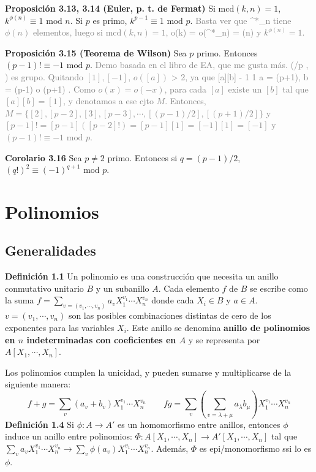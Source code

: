 \documentclass[a4paper, 11pt]{extarticle}
\newcommand{\propo}[1]{\textcolor{rojo}{\textbf{Proposición #1}}}
\newcommand{\defi}[1]{\textcolor{azul}{\textbf{Definición #1}}}
\newcommand{\cor}[1]{\textcolor{rosa}{\textbf{Corolario #1}}}
\begin{document}
{\propo{3.13, 3.14 (Euler, p. t. de Fermat)} Si \(\text{mcd}(k,n) = 1\), \(k^{\phi(n)} \equiv 1 \text{ mod } n\). Si \(p\) es primo, \(k^{p-1} \equiv 1
\text{ mod } p\).
\textcolor{gray}{\footnotesize Basta ver que ^*_n tiene \( \phi(n) \) 
elementos, luego si \( \text{mcd}(k,n) = 1 \), o(k) = o(^*_n) = \phi(n) y \( k^{\phi(n)} = 1 \).}

\propo{3.15 (Teorema de Wilson)} Sea \(p\) primo. Entonces \((p-1)! \equiv -1
\text{ mod } p\). 
\textcolor{gray}{\footnotesize Demo basada en el libro de EA, que me gusta más.
(/p , \cdot)\) es grupo. Quitando \( [1], [-1] \), \( o([a]) \) > 2,
ya que [a][b] \equiv - 1  1 \iff a = (p+1), b = (p-1) o (p+1) \). Como \( o(x) = o(-x) \),
para cada \( [a] \) existe un \( [b] \) tal que \( [a][b] = [1] \), y denotamos a ese cjto \( M \).
Entonces, \( M = \{ [2], [p-2], [3], [p-3], \cdots, [(p-1)/2], [(p+1)/2] \} \) y
\( [p-1]! = [p-1]([p-2]!) = [p-1][1] = [-1][1] = [-1] \) y \( (p-1)! \equiv -1 \text{ mod } p \).  }

\cor{3.16} Sea \(p \neq 2\) primo. Entonces si \(q = (p-1)/2\), \((q!)^2
\equiv (-1)^{q+1} \text{ mod } p\).

\section*{Polinomios}
\label{sec:orgb2b4b92}
\subsection*{Generalidades}
\label{sec:org7f20d91}
\defi{1.1} Un polinomio es una construcción que necesita un anillo conmutativo
unitario \(B\) y un subanillo \(A\). Cada elemento \(f\) de \(B\) se
escribe como la suma \(f = \sum _{v = (v_1, \cdots, v_n)}^{}a_vX_1^{v_1}\cdots 
X_n^{v_n}\) donde cada \(X_i \in B\) y \(a \in A\). \(v = (v_1, \cdots,
v_n)\) son las posibles combinaciones distintas de cero de los exponentes para
las variables \(X_i\). Este anillo se denomina \textbf{anillo de polinomios en \(n\) 
indeterminadas con coeficientes en \(A\)} y se representa por \(A[X_1, \cdots,
X_n]\).

Los polinomios cumplen la unicidad, y pueden sumarse y multiplicarse de la
siguiente manera:
\[ f + g = \sum _{v}^{}(a_v + b_v) X_1^{v_1}\cdots X_n^{v_n} \qquad 
fg = \sum _{v}^{}\left( \sum _{v = \lambda + \mu}^{}a _\lambda b_\mu \right) 
X_1^{v_1}\cdots X_n^{v_n} \]
\defi{1.4} Si \(\phi: A \rightarrow A'\) es un homomorfismo entre anillos,
entonces \(\phi\) induce un anillo entre polinomios: \(\Phi: A[X_1, \cdots,
X_n] \rightarrow  A'[X_1, \cdots, X_n]\) tal que \(\sum _{v}^{}a_v
X_1^{v_1}\cdots X_n^{v_n} \rightarrow  \sum _{v}^{}\phi(a_v) X_1^{v_1}\cdots
X_n^{v_n}\). Además, \(\Phi\) es epi/monomorfismo ssi lo es \(\phi\).

}
\end{document}
